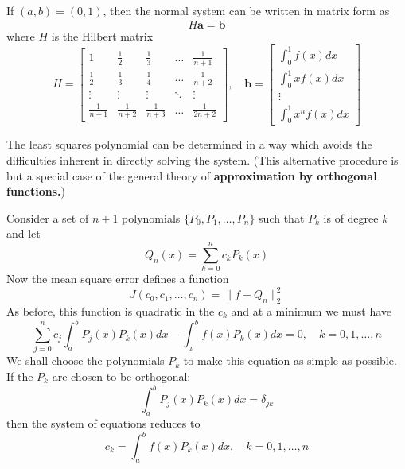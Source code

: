 \documentclass[../main.tex]{subfiles}
\begin{document}
If $(a,b) = (0,1)$, then the normal system can be written in matrix form as
\begin{equation*}
	H \hat{\boldsymbol{a}} = \boldsymbol{b}
\end{equation*}
where $H$ is the Hilbert matrix
\begin{equation*}
	H = \begin{bmatrix}
		1             & \frac{1}{2}   & \frac{1}{3}   & \dots  & \frac{1}{n+1}  \\
		\frac{1}{2}   & \frac{1}{3}   & \frac{1}{4}   & \dots  & \frac{1}{n+2}  \\
		\vdots        & \vdots        & \vdots        & \ddots & \vdots         \\
		\frac{1}{n+1} & \frac{1}{n+2} & \frac{1}{n+3} & \dots  & \frac{1}{2n+2}
	\end{bmatrix}, \quad
	\boldsymbol{b} = \begin{bmatrix}
		\int_0^1 f(x) dx   \\[6pt]
		\int_0^1 x f(x) dx \\[6pt]
		\vdots             \\[6pt]
		\int_0^1 x^n f(x) dx
	\end{bmatrix}
\end{equation*}

The least squares polynomial can be determined in a way which avoids the difficulties inherent in directly solving the system. (This alternative procedure is but a special case of the general theory of \textbf{approximation by orthogonal functions.})

Consider a set of $n+1$ polynomials $\{P_0, P_1, \dots, P_n\}$ such that $P_k$ is of degree $k$ and let
\begin{equation}
	Q_n(x) = \sum_{k=0}^n c_k P_k(x)
\end{equation}
Now the mean square error defines a function
\begin{equation}
	J(c_0, c_1, \dots, c_n) = \| f - Q_n \|_2^2
\end{equation}
As before, this function is quadratic in the $c_k$ and at a minimum we must have
\begin{equation*}
	\sum_{j=0}^n c_j \int_a^b P_j(x) P_k(x) dx - \int_a^b f(x) P_k(x) dx = 0, \quad k = 0, 1, \dots, n
\end{equation*}
We shall choose the polynomials $P_k$ to make this equation as simple as possible. If the $P_k$ are chosen to be orthogonal:
\begin{equation}
	\int_a^b P_j(x) P_k(x) dx = \delta_{jk}
\end{equation}
then the system of equations reduces to
\begin{equation}
	c_k = \int_a^b f(x) P_k(x) dx, \quad k = 0, 1, \dots, n
\end{equation}
\end{document}
